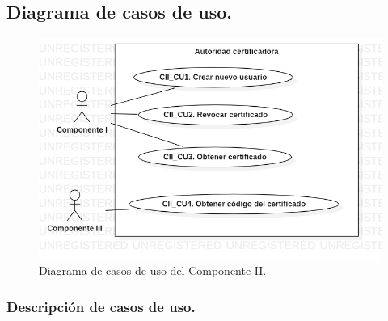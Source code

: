 \documentclass[12pt, a4paper, titlepage]{report}
\begin{document}
    		\subsection{Diagrama de casos de uso.}
    		
    			\begin{figure}[H]
                	\begin{center}	\includegraphics[width=13cm]{./imagenes/Disenio/Componente_2/CII_UCD.png}
                	\caption{Diagrama de casos de uso del Componente II.}
                	\end{center}
        		\end{figure}
		    
		    \subsubsection{Descripción de casos de uso.}
		
\end{document}
